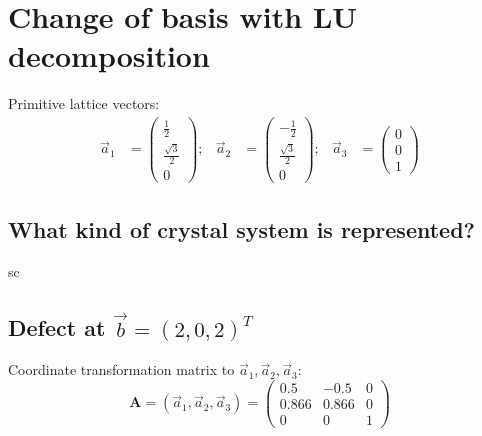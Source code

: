 \section{Change of basis with LU decomposition}

Primitive lattice vectors:
\begin{align}
    \vec{a}_1 &= 
    \begin{pmatrix}
        \frac{1}{2} \\[2pt] \frac{\sqrt{3}}{2} \\[2pt] 0
    \end{pmatrix};
    &
    \vec{a}_2 &=
    \begin{pmatrix}
        -\frac{1}{2} \\[2pt] \frac{\sqrt{3}}{2} \\[2pt] 0
    \end{pmatrix};
    &
    \vec{a}_3 &=
    \begin{pmatrix}
        0 \\
        0 \\
        1
    \end{pmatrix}
\end{align}

\renewcommand\thesubsection{\thesection.\alph{subsection})}

\subsection{What kind of crystal system is represented?}

sc

\subsection{Defect at $\vec{b} = (2,0,2)^T$}

Coordinate transformation matrix to ${\vec{a}_1,\vec{a}_2,\vec{a}_3}$:
\begin{equation}
    \symbf{A} = (\vec{a}_1,\vec{a}_2,\vec{a}_3) =
    \begin{pmatrix}
        0.5 & -0.5 & 0 \\
        0.866 & 0.866 & 0 \\
        0 & 0 & 1
    \end{pmatrix}
\end{equation}

